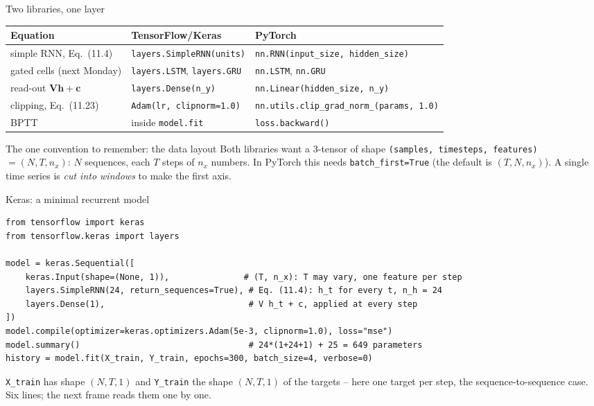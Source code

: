 \documentclass[10pt,aspectratio=169]{beamer}
\begin{document}
\begin{frame}{Two libraries, one layer}
\begin{center}
\footnotesize
\begin{tabular}{lll}
\toprule
Equation & TensorFlow/Keras & PyTorch\\
\midrule
simple RNN, Eq.~(11.4) & \texttt{layers.SimpleRNN(units)} & \texttt{nn.RNN(input\_size, hidden\_size)}\\
gated cells (next Monday) & \texttt{layers.LSTM}, \texttt{layers.GRU} & \texttt{nn.LSTM}, \texttt{nn.GRU}\\
read-out $\bm{V}\bm{h}+\bm{c}$ & \texttt{layers.Dense(n\_y)} & \texttt{nn.Linear(hidden\_size, n\_y)}\\
clipping, Eq.~(11.23) & \texttt{Adam(lr, clipnorm=1.0)} & \texttt{nn.utils.clip\_grad\_norm\_(params, 1.0)}\\
BPTT & inside \texttt{model.fit} & \texttt{loss.backward()}\\
\bottomrule
\end{tabular}
\end{center}
\begin{block}{The one convention to remember: the data layout}
Both libraries want a 3-tensor of shape \texttt{(samples, timesteps,
features)} $=(N,T,n_x)$: $N$ sequences, each $T$ steps of $n_x$ numbers.
In PyTorch this needs \texttt{batch\_first=True} (the default is
$(T,N,n_x)$).  A single time series is \emph{cut into windows} to make the
first axis.
\end{block}
\end{frame}

\begin{frame}[fragile]{Keras: a minimal recurrent model}
\begin{lstlisting}
from tensorflow import keras
from tensorflow.keras import layers

model = keras.Sequential([
    keras.Input(shape=(None, 1)),               # (T, n_x): T may vary, one feature per step
    layers.SimpleRNN(24, return_sequences=True), # Eq. (11.4): h_t for every t, n_h = 24
    layers.Dense(1),                             # V h_t + c, applied at every step
])
model.compile(optimizer=keras.optimizers.Adam(5e-3, clipnorm=1.0), loss="mse")
model.summary()                                  # 24*(1+24+1) + 25 = 649 parameters
history = model.fit(X_train, Y_train, epochs=300, batch_size=4, verbose=0)
\end{lstlisting}
\small
\texttt{X\_train} has shape $(N,T,1)$ and \texttt{Y\_train} the shape
$(N,T,1)$ of the targets -- here one target per step, the
sequence-to-sequence case.  Six lines; the next frame reads them one by one.
\end{frame}
\end{document}
